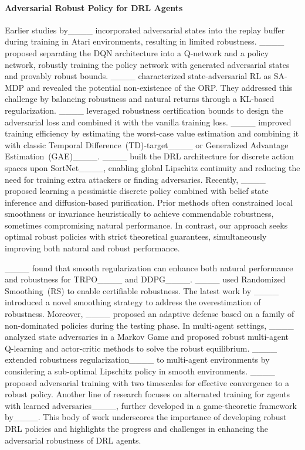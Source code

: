 \paragraph{Adversarial Robust Policy for DRL Agents}
Earlier studies by____ incorporated adversarial states into the replay buffer during training in Atari environments, resulting in limited robustness. 
____ proposed separating the DQN architecture into a Q-network and a policy network, robustly training the policy network with generated adversarial states and provably robust bounds.
____ characterized state-adversarial RL as SA-MDP and revealed the potential non-existence of the ORP. They addressed this challenge by balancing robustness and natural returns through a KL-based regularization.
____ leveraged robustness certification bounds to design the adversarial loss and combined it with the vanilla training loss.
____ improved training efficiency by estimating the worst-case value estimation and combining it with classic Temporal Difference~(TD)-target____ or Generalized Advantage Estimation~(GAE)____.
____ built the DRL architecture for discrete action spaces upon SortNet____, enabling global Lipschitz continuity and reducing the need for training extra attackers or finding adversaries. 
Recently, ____ proposed learning a pessimistic discrete policy combined with belief state inference and diffusion-based purification.
Prior methods often constrained local smoothness or invariance heuristically to achieve commendable robustness, sometimes compromising natural performance. In contrast, our approach seeks optimal robust policies with strict theoretical guarantees, simultaneously improving both natural and robust performance.

____ found that smooth regularization can enhance both natural performance and robustness for TRPO____ and DDPG____.
____ used Randomized Smoothing~(RS) to enable certifiable robustness.
The latest work by ____ introduced a novel smoothing strategy to address the overestimation of robustness.
Moreover, ____ proposed an adaptive defense based on a family of non-dominated policies during the testing phase. 
In multi-agent settings, ____ analyzed state adversaries in a Markov Game and proposed robust multi-agent Q-learning and actor-critic methods to solve the robust equilibrium.
____ extended robustness regularization____ to multi-agent environments by considering a sub-optimal Lipschitz policy in smooth environments. 
____ proposed adversarial training with two timescales for effective convergence to a robust policy.
Another line of research focuses on alternated training for agents with learned adversaries____, further developed in a game-theoretic framework by____.
This body of work underscores the importance of developing robust DRL policies and highlights the progress and challenges in enhancing the adversarial robustness of DRL agents.